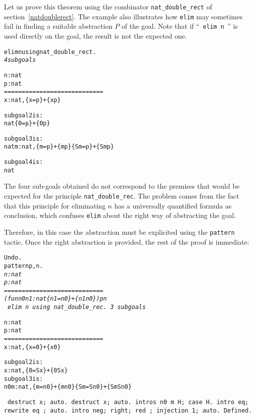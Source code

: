 \documentclass[11pt]{article}
\begin{document}
Let us prove this theorem using the combinator \texttt{nat\_double\_rect}
of section~\ref{natdoublerect}. The example also illustrates how
\texttt{elim} may sometimes fail in finding a suitable abstraction $P$
of the goal. Note that if ``~\texttt{elim n}~''
 is used directly on the
goal, the result is not the expected one.

\vspace{12pt}

\begin{alltt}
 elim n using nat_double_rect.
\it
4 subgoals

  n : nat
  p : nat
  ============================
   {\prodsym} x : nat, \{x = p\} + \{x {\coqdiff} p\}

subgoal 2 is:
 nat {\arrow} \{0 = p\} + \{0 {\coqdiff} p\}

subgoal 3 is:
 nat {\arrow} {\prodsym} m : nat, \{m = p\} + \{m {\coqdiff} p\} {\arrow} \{S m = p\} + \{S m {\coqdiff} p\}

subgoal 4 is:
 nat
\end{alltt}

The four sub-goals obtained do not correspond to the premises that
would be expected for the principle \texttt{nat\_double\_rec}. The
problem comes from the fact that
this principle for eliminating $n$
has a universally quantified formula as conclusion, which confuses
\texttt{elim} about the right way of abstracting the goal.






Therefore,
in this case the abstraction must be explicited using the
\texttt{pattern} tactic. Once the right abstraction is provided, the rest of
the proof is immediate:

\begin{alltt}
Undo.
 pattern p,n.
\it
  n : nat
  p : nat
  ============================
   (fun n0 n1 : nat {\funarrow} \{n1 = n0\} + \{n1 {\coqdiff} n0\}) p n
\tt
 elim n using nat_double_rec.
\it
3 subgoals

  n : nat
  p : nat
  ============================
   {\prodsym} x : nat, \{x = 0\} + \{x {\coqdiff} 0\}

subgoal 2 is:
 {\prodsym} x : nat, \{0 = S x\} + \{0 {\coqdiff} S x\}
subgoal 3 is:
 {\prodsym} n0 m : nat, \{m = n0\} + \{m {\coqdiff} n0\} {\arrow} \{S m = S n0\} + \{S m {\coqdiff} S n0\}

\tt
 destruct x; auto.
 destruct x; auto.
 intros n0 m H; case H.
 intro eq; rewrite eq ; auto.
 intro neg; right; red ; injection 1; auto.
Defined.
\end{alltt}
\end{document}
